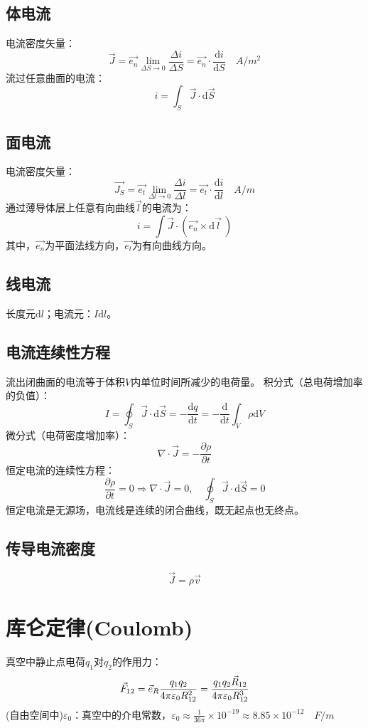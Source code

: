 \subsection*{体电流}
电流密度矢量：
$$ \vec{J} = \vec{e_n} \lim\limits_{\Delta S \to 0} \frac{\Delta i}{\Delta S} = \vec{e_n} \cdot \frac{\mathrm{d}i}{\mathrm{d}S} \quad A/m^2 $$
流过任意曲面的电流：
$$ i = \int_S\vec{J}\cdot\mathrm{d}\vec{S} $$

\subsection*{面电流}
电流密度矢量：
$$ \vec{J_S} = \vec{e_t} \lim\limits_{\Delta l \to 0} \frac{\Delta i}{\Delta l} = \vec{e_t} \cdot \frac{\mathrm{d}i}{\mathrm{d}l} \quad A/m $$
通过薄导体层上任意有向曲线$\vec{l}$的电流为：
$$ i = \int \vec{J} \cdot \left(\vec{e_n} \times \mathrm{d}\vec{l}\ \right)$$
其中，$\vec{e_n}$为平面法线方向，$\vec{e_t}$为有向曲线方向。

\subsection*{线电流}
长度元$\mathrm{d}l$；电流元：$I\mathrm{d}l$。

\subsection*{电流连续性方程}
流出闭曲面的电流等于体积$V$内单位时间所减少的电荷量。
积分式（总电荷增加率的负值）：
$$ I = \oint_S \vec{J} \cdot \mathrm{d}\vec{S} = -\frac{\mathrm{d}q}{\mathrm{d}t} = -\frac{\mathrm{d}}{\mathrm{d}t} \int_V \rho \mathrm{d}V $$
微分式（电荷密度增加率）：
$$ \nabla \cdot \vec{J} = -\frac{\partial \rho}{\partial t} $$
恒定电流的连续性方程：
$$ \frac{\partial \rho}{\partial t} = 0 \Rightarrow \nabla \cdot \vec{J} = 0,\quad \oint_S \vec{J} \cdot \mathrm{d}\vec{S} = 0 $$
恒定电流是无源场，电流线是连续的闭合曲线，既无起点也无终点。

\subsection*{传导电流密度}
$$ \vec{J} = \rho\vec{v} $$

\section{库仑定律(Coulomb)}
真空中静止点电荷$q_1$对$q_2$的作用力：
$${\vec F_{12}} = {\vec e_R}{{{q_1}{q_2}} \over {4{\rm{\pi }}{\varepsilon _0}R_{12}^2}} = {{{q_1}{q_2}{{\vec R}_{12}}} \over {4{\rm{\pi }}{\varepsilon _0}R_{12}^3}}$$
(自由空间中)$\varepsilon_0$：真空中的介电常数，$\varepsilon_0 \approx \frac{1}{36\pi}\times10^{-19}\approx8.85\times10^{-12}\quad F/m$

